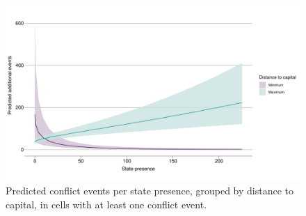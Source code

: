 \documentclass[12pt]{article}
\begin{document}












\begin{figure}[htpb]
	\centering
	\includegraphics[width=\linewidth]{"../R/Output/bothzinbplot.pdf"}
	\caption{Predicted conflict events per state presence, grouped by
	distance to capital, in cells with at least one conflict event.}
	\label{bothzinb_int}
\end{figure}

\end{document}
